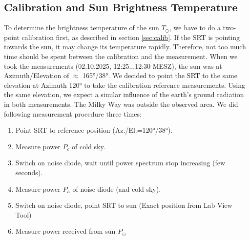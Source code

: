\subsection{Calibration and Sun Brightness Temperature}
To determine the brightness temperature of the sun $T_\odot$, we have to do a two-point calibration first, as described in section \ref{sec:calib}. If the SRT is pointing towards the sun, it may change its temperature rapidly. Therefore, not too much time should be spent between the calibration and the measurement. When we took the measurements (02.10.2025, 12:25...12:30 MESZ), the sun was at Azimuth/Elevation of $\approx$ 165°/38°. We decided to point the SRT to the same elevation at Azimuth 120° to take the calibration reference measurements. Using the same elevation, we expect a similar influence of the earth's ground radiation in both measurements. The Milky Way was outside the observed area. We did following measurement procedure three times:

\begin{enumerate}
	\item Point SRT to reference position (Az./El.=120°/38°).
	\item Measure power $P_c$ of cold sky.
	\item Switch on noise diode, wait until power spectrum stop increasing (few seconds).
	\item Measure power $P_h$ of noise diode (and cold sky).
	\item Switch on noise diode, point SRT to sun (Exact position from Lab View Tool)
	\item Measure power received from sun $P_\odot$
\end{enumerate}

